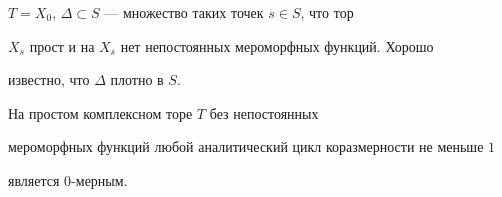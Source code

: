 $T=X_0$, $\Delta\subset S$ --- множество таких точек $s\in S$, что тор


$X_s$ прост и на $X_s$ нет непостоянных мероморфных функций. Хорошо


известно, что $\Delta$ плотно в $S$.





\begin{thm}


На простом комплексном торе $T$ без непостоянных


мероморфных функций любой аналитический цикл коразмерности не меньше $1$


является $0$-мерным.


\end{thm}





